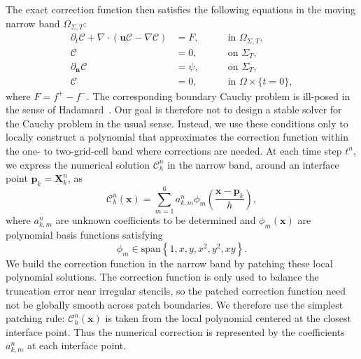 \documentclass[11pt,reqno]{amsart}
\theoremstyle{plain}
\theoremstyle{definition}
\numberwithin{equation}{section}
\newcommand{\paren}[1]{\left(#1\right)}
\newcommand{\grad}[1]{\nabla #1}
\newcommand{\bm}[1]{\boldsymbol{#1}}
\newcommand{\Corr}{\mathcal C}
\begin{document}
The exact correction function then satisfies the following equations in the moving narrow band $\Omega_{\Sigma,T}$:
\begin{equation}\label{eqn:cauchy-C}
\begin{aligned}
\partial_t \Corr + \grad\cdot\paren{\bm u\Corr - \grad \Corr} &= F, \quad&&\text{ in }\Omega_{\Sigma,T}, \\
\Corr &= 0, \quad&&\text{ on }\Sigma_T,\\
\partial_{\bm n} \Corr &= \psi, \quad&&\text{ on }\Sigma_T,\\
\Corr &= 0, \quad && \text{ in }\Omega\times \{t=0\},
\end{aligned}
\end{equation}
where $F = f^+ - f^-$. The corresponding boundary Cauchy problem is ill-posed in the sense of Hadamard~\cite{Hadamard1923}. Our goal is therefore not to design a stable solver for the Cauchy problem in the usual sense. Instead, we use these conditions only to locally construct a polynomial that approximates the correction function within the one- to two-grid-cell band where corrections are needed.
At each time step $t^n$, we express the numerical solution $\Corr_h^n$ in the narrow band, around an interface point $\bm p_k=\bm X_k^n$, as
\begin{equation}
    \Corr_h^{n}(\bm x) = \sum_{m=1}^6 a_{k,m}^{n} \phi_m\paren{\frac{\bm x - \bm p_k}{h}},
\end{equation}
where $a_{k,m}^{n}$ are unknown coefficients to be determined and $\phi_m(\bm x)$ are polynomial basis functions satisfying
\begin{equation}
  \phi_m \in \text{span}\left\{ 1, x, y, x^2, y^2, xy \right\}.
\end{equation}
We build the correction function in the narrow band by patching these local polynomial solutions. The correction function is only used to balance the truncation error near irregular stencils, so the patched correction function need not be globally smooth across patch boundaries. We therefore use the simplest patching rule: $\Corr_h^n(\bm x)$ is taken from the local polynomial centered at the closest interface point. Thus the numerical correction is represented by the coefficients $a_{k,m}^n$ at each interface point.
\end{document}
